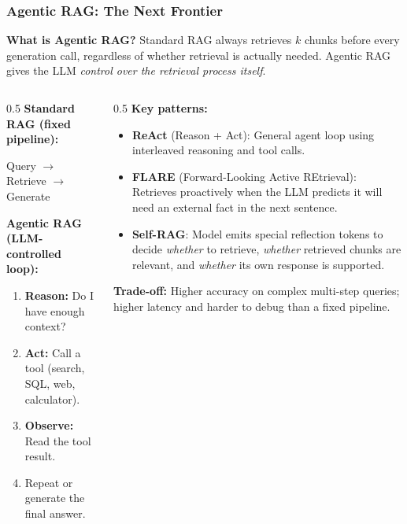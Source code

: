 \begin{frame}[fragile]\frametitle{Agentic RAG: The Next Frontier}

\textbf{What is Agentic RAG?}
Standard RAG always retrieves $k$ chunks before every generation call, regardless of whether retrieval is actually needed. Agentic RAG gives the LLM \textit{control over the retrieval process itself}.

\begin{columns}
  \begin{column}[T]{0.5\linewidth}
    \textbf{Standard RAG (fixed pipeline):}
    \begin{center}
    \small Query $\rightarrow$ Retrieve $\rightarrow$ Generate
    \end{center}

    \vspace{0.4em}
    \textbf{Agentic RAG (LLM-controlled loop):}
    \begin{enumerate}
      \item \textbf{Reason:} Do I have enough context?
      \item \textbf{Act:} Call a tool (search, SQL, web, calculator).
      \item \textbf{Observe:} Read the tool result.
      \item Repeat or generate the final answer.
    \end{enumerate}
  \end{column}
  \begin{column}[T]{0.5\linewidth}
    \textbf{Key patterns:}
    \begin{itemize}
      \item \textbf{ReAct} (Reason + Act): General agent loop using interleaved reasoning and tool calls.
      \item \textbf{FLARE} (Forward-Looking Active REtrieval): Retrieves proactively when the LLM predicts it will need an external fact in the next sentence.
      \item \textbf{Self-RAG}: Model emits special reflection tokens to decide \textit{whether} to retrieve, \textit{whether} retrieved chunks are relevant, and \textit{whether} its own response is supported.
    \end{itemize}

    \vspace{0.3em}
    \textbf{Trade-off:} Higher accuracy on complex multi-step queries; higher latency and harder to debug than a fixed pipeline.
  \end{column}
\end{columns}

\end{frame}


